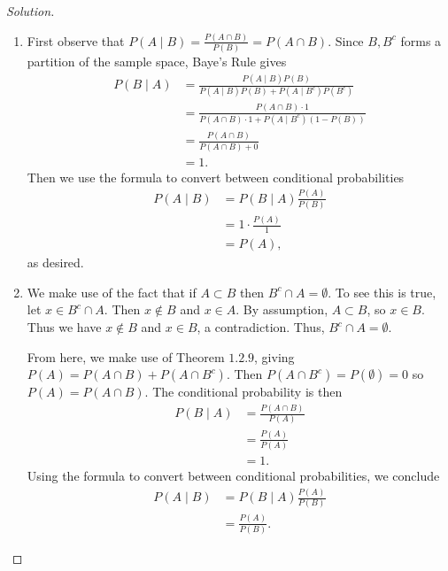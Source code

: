 \documentclass[12pt]{article}
\theoremstyle{definition}
\theoremstyle{plain}
\newenvironment{solution}
  {\begin{proof}[Solution]}
  {\end{proof}}
\begin{document}
\begin{enumerate}
	
\begin{solution}
	\begin{enumerate}
	\item First observe that $ P(A \mid B) = \frac{P(A \cap B)}{P(B)} = P(A \cap B) $. Since $ B, B^c $ forms a partition of the sample space, Baye's Rule gives
	\begin{align*}
		P(B \mid A) &= \frac{ P(A \mid B) P(B) } {  P(A \mid B) P(B) + P(A \mid B^c) P(B^c)} \\
		&= \frac{P(A \cap B) \cdot 1}{ P(A \cap B)\cdot 1 + P(A \mid B^c) (1 - P(B))}\\
		&= \frac{ P(A \cap B)}{ P(A \cap B) + 0}\\
		&= 1.
	\end{align*}
	Then we use the formula to convert between conditional probabilities
	\begin{align*}
		P(A \mid B) &= P(B \mid A) \frac{P(A)}{P(B)}\\
		&= 1 \cdot \frac{P(A)}{1}\\
		&= P(A),
	\end{align*}
	as desired.
	
	\item We make use of the fact that if $ A \subset B $ then $ B^c \cap A = \emptyset $. To see this is true, let $ x \in B^c \cap A $. Then $ x \notin B $ and $ x \in A $. By assumption, $ A \subset B $, so $ x \in B $. Thus we have $ x \notin B $ and $ x \in B $, a contradiction. Thus, $ B^c \cap A = \emptyset $.
	
	From here, we make use of Theorem $ 1.2.9 $, giving $ P(A) = P(A \cap B) + P(A \cap B^c)$. Then $ P(A \cap B^c) = P(\emptyset) = 0 $ so $ P(A) = P(A \cap B) $. The conditional probability is then 
	\begin{align*}
		P(B \mid A) &= \frac{P(A \cap B)}{P(A)}\\
		&= \frac{P(A)}{P(A)}\\
		&= 1.
	\end{align*}
	Using the formula to convert between conditional probabilities, we conclude
	\begin{align*}
		P(A \mid B) &= P(B \mid A) \frac{P(A)}{P(B)}\\
		&= \frac{P(A)}{P(B)}.
	\end{align*}
	

\end{enumerate}
\end{solution}
\end{enumerate}
\end{document}
